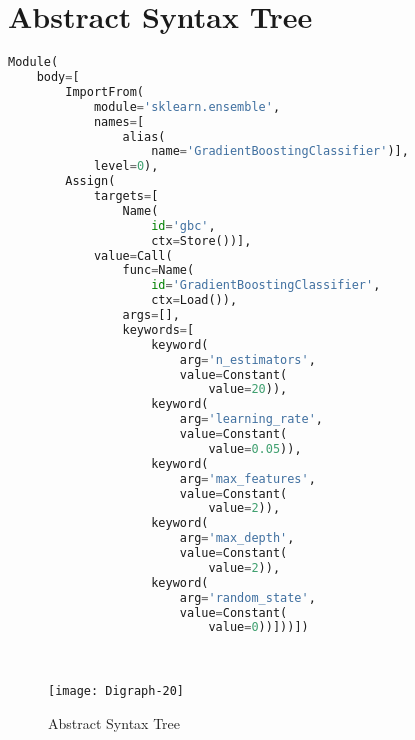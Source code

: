 \documentclass[german,bachelor]{swsLeipzig}
\begin{document}
\chapter{Abstract Syntax Tree}
\begin{lstlisting}[language=Python, frame=single, basicstyle=\small]
Module(
    body=[
        ImportFrom(
            module='sklearn.ensemble',
            names=[
                alias(
                    name='GradientBoostingClassifier')],
            level=0),
        Assign(
            targets=[
                Name(
                    id='gbc',
                    ctx=Store())],
            value=Call(
                func=Name(
                    id='GradientBoostingClassifier',
                    ctx=Load()),
                args=[],
                keywords=[
                    keyword(
                        arg='n_estimators',
                        value=Constant(
                            value=20)),
                    keyword(
                        arg='learning_rate',
                        value=Constant(
                            value=0.05)),
                    keyword(
                        arg='max_features',
                        value=Constant(
                            value=2)),
                    keyword(
                        arg='max_depth',
                        value=Constant(
                            value=2)),
                    keyword(
                        arg='random_state',
                        value=Constant(
                            value=0))]))])
\end{lstlisting}
\


\begin{figure}[h]
 \centering
 \texttt{[image: Digraph-20]}
 \caption{Abstract Syntax Tree}
 \label{fig:asdt}
\end{figure}

\end{document}
